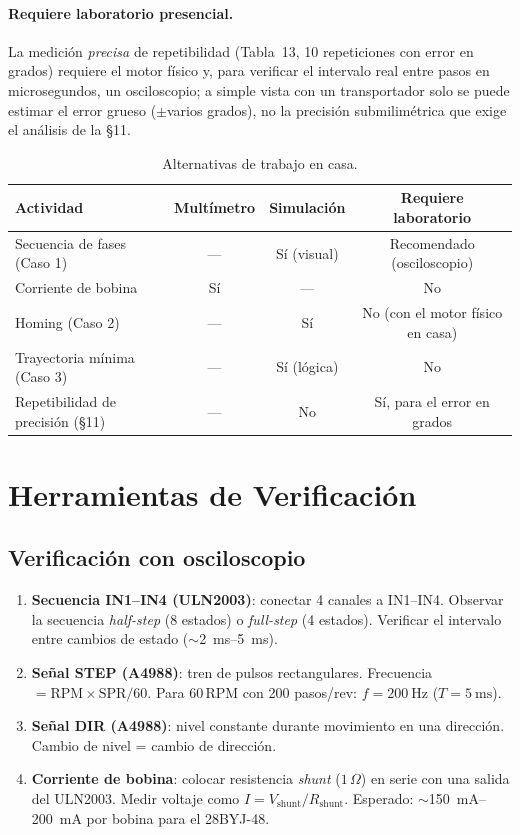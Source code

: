 \documentclass[11pt]{article}
\begin{document}
\paragraph{Requiere laboratorio presencial.} La medición \emph{precisa} de repetibilidad
(Tabla~13, 10 repeticiones con error en grados) requiere el motor físico y, para
verificar el intervalo real entre pasos en microsegundos, un osciloscopio; a simple vista
con un transportador solo se puede estimar el error grueso ($\pm$varios grados), no la
precisión submilimétrica que exige el análisis de la \S11.

\begin{table}[H]\centering
\caption{Alternativas de trabajo en casa.}
\begin{tabular}{lccc}
\toprule
Actividad & Multímetro & Simulación & Requiere laboratorio \\
\midrule
Secuencia de fases (Caso 1) & --- & Sí (visual) & Recomendado (osciloscopio) \\
Corriente de bobina & Sí & --- & No \\
Homing (Caso 2) & --- & Sí & No (con el motor físico en casa) \\
Trayectoria mínima (Caso 3) & --- & Sí (lógica) & No \\
Repetibilidad de precisión (\S11) & --- & No & Sí, para el error en grados \\
\bottomrule
\end{tabular}
\end{table}

\section{Herramientas de Verificación}
\subsection{Verificación con osciloscopio}
\begin{enumerate}
  \item \textbf{Secuencia IN1--IN4 (ULN2003)}: conectar 4 canales a IN1--IN4. Observar la
        secuencia \emph{half-step} (8 estados) o \emph{full-step} (4 estados). Verificar
        el intervalo entre cambios de estado ($\sim$\SIrange{2}{5}{\milli\second}).
  \item \textbf{Señal STEP (A4988)}: tren de pulsos rectangulares. Frecuencia
        $=\text{RPM}\times\text{SPR}/60$. Para 60\,RPM con 200 pasos/rev:
        $f=\SI{200}{\hertz}$ ($T=\SI{5}{\milli\second}$).
  \item \textbf{Señal DIR (A4988)}: nivel constante durante movimiento en una dirección.
        Cambio de nivel = cambio de dirección.
  \item \textbf{Corriente de bobina}: colocar resistencia \emph{shunt} ($1\,\Omega$) en
        serie con una salida del ULN2003. Medir voltaje como $I=V_\text{shunt}/R_\text{shunt}$.
        Esperado: $\sim$\SIrange{150}{200}{\milli\ampere} por bobina para el 28BYJ-48.
\end{enumerate}
\end{document}
